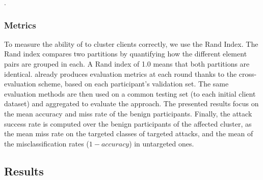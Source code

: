 . 


\subsubsection{Metrics\label{sec:eval.methodo.metrics}}
To measure the ability of \thecontrib to cluster clients correctly, we use the Rand Index. 
The Rand index compares two partitions by quantifying how the different element pairs are grouped in each. 
A Rand index of 1.0 means that both partitions are identical. 
\thecontrib already produces evaluation metrics at each round thanks to the cross-evaluation scheme, based on each participant's validation set.
The same evaluation methods are then used on a common testing set (to each initial client dataset) and aggregated to evaluate the approach.
The presented results focus on the mean accuracy and miss rate of the benign participants.
Finally, the attack success rate is computed over the benign participants of the affected cluster, as the mean miss rate on the targeted classes of targeted attacks, and the mean of the misclassification rates (\ie $1-accuracy$) in untargeted ones.




\subsection{Results\label{sec:eval.results}}



